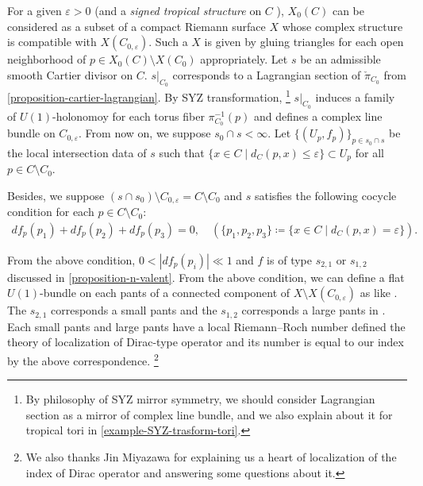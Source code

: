 \documentclass[a4paper,dvipdfmx,reqno,12pt]{amsart}
\theoremstyle{definition}
\newcommand{\deq}{\coloneqq}
\newcommand{\vep}{\varepsilon}%
\newcommand{\myfootnote}[1]{\hspace{-5pt}\footnote{#1}}
\numberwithin{equation}{section}
\begin{document}
For a given $\vep>0$ (and a \emph{signed tropical structure}
on $C$ \cite{MR3076066}), 
$X_0(C)$ can be considered as a subset of a compact 
Riemann surface $X$ whose complex structure is 
compatible with $X(C_{0,\vep})$. 
Such a $X$ is given by gluing triangles for 
each open neighborhood of $p\in X_0(C)\setminus X(C_0)$
appropriately.
Let $s$ be an admissible smooth Cartier divisor on $C$.
$s|_{C_0}$ corresponds to a Lagrangian section of 
$\check{\pi}_{C_0}$ from 
\cref{proposition-cartier-lagrangian}.
By SYZ transformation,
\myfootnote{By philosophy of SYZ mirror symmetry,
we should consider Lagrangian section 
as a mirror of complex line bundle,
and we also explain about it for tropical tori in 
\cref{example-SYZ-trasform-tori}.
}
$s|_ {C_0}$ induces a family of $U(1)$-holonomoy for
each torus fiber $\pi_{C_0}^{-1}(p)$ and defines a 
complex line bundle on $C_{0,\vep}$. From now on, 
we suppose $s_0\cap s<\infty$. 
Let $\{(U_p, f_p)\}_{p\in s_0\cap s}$ be the local intersection data 
of $s$ such that 
$\{x\in C\mid d_C(p,x)\leq \vep\}\subset U_p$ for
all $p\in C\setminus C_0$.

Besides, we suppose 
$(s\cap s_0)\setminus C_{0,\vep}=C\setminus C_0$ and $s$ satisfies the following cocycle
condition for each $p\in C\setminus C_0$:
\begin{align}
df_p(p_1)+df_p(p_2)+df_p(p_3)=0,\quad 
(\{p_1,p_2,p_3\}\deq \{x\in C\mid d_C(p,x)=\vep\}).
\end{align}

From the above condition, $0<|df_p(p_i)| \ll 1$ and
$f$ is of type $s_{2,1}$ or $s_{1,2}$ discussed
in \cref{proposition-n-valent}.
From the above condition, we can define 
a flat $U(1)$-bundle on each pants of a 
connected component of $X\setminus X(C_{0,\vep})$
as like \cite[6.1.3]{MR2676658}. The $s_{2,1}$
corresponds a small pants and the $s_{1,2}$
corresponds a large pants in 
\cite[Definition 6.3]{MR2676658}.
Each small pants and large pants have a local 
Riemann--Roch number defined the theory of 
localization of Dirac-type operator and its 
number is equal 
to our index by the above correspondence.
\myfootnote{
We also thanks Jin Miyazawa
for explaining us a heart of localization of 
the index of Dirac operator and answering some 
questions about it.}
\end{document}

